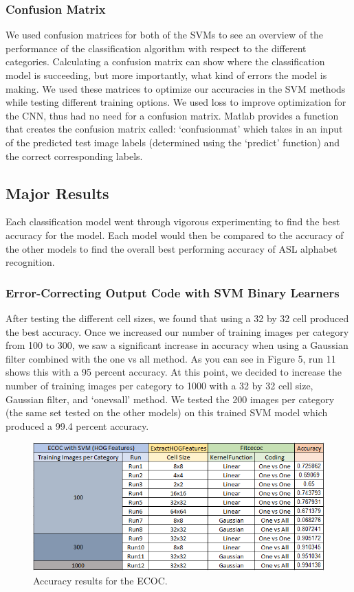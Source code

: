 \documentclass[conference]{IEEEtran}
\begin{document}
\subsubsection{Confusion Matrix}
We used confusion matrices for both of the SVMs to see an overview of the performance of the classification algorithm with respect to the different categories. Calculating a confusion matrix can show where the classification model is succeeding, but more importantly, what kind of errors the model is making. We used these matrices to optimize our accuracies in the SVM methods while testing different training options. We used loss to improve optimization for the CNN, thus had no need for a confusion matrix. Matlab provides a function that creates the confusion matrix called: ‘confusionmat’ which takes in an input of the predicted test image labels (determined using the ‘predict’ function) and the correct corresponding labels.
\subsection{Major Results}
Each classification model went through vigorous experimenting to find the best accuracy for the model. Each model would then be compared to the accuracy of the other models to find the overall best performing accuracy of ASL alphabet recognition.
\subsubsection{Error-Correcting Output Code with SVM Binary Learners}
After testing the different cell sizes, we found that using a 32 by 32 cell produced the best accuracy. Once we increased our number of training images per category from 100 to 300, we saw a significant increase in accuracy when using a Gaussian filter combined with the one vs all method. As you can see in Figure 5, run 11 shows this with a 95 percent accuracy. At this point, we decided to increase the number of training images per category to 1000 with a 32 by 32 cell size, Gaussian filter, and ‘onevsall’ method. We tested the 200 images per category (the same set tested on the other models) on this trained SVM model which produced a 99.4 percent accuracy.
\begin{figure}[b]
\centering
\includegraphics[width=\linewidth]{ECOC}
\caption{Accuracy results for the ECOC.}
\end{figure}
\end{document}
